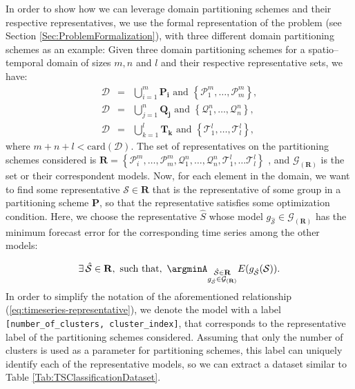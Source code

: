 In order to show how we can leverage domain partitioning schemes and their respective representatives, we use the formal representation of the problem (see Section \ref{Sec:ProblemFormalization}), with three different domain partitioning schemes as an example: Given three domain partitioning schemes for a spatio--temporal domain of sizes $m, n$ and $l$ and their respective representative sets, we have:
\begin{eqnarray} 
\nonumber
\mathcal{D}	& = & \bigcup_{i=1}^{m} \mathbf{P_i} \,\,\textrm{and} \,\, \left\{\mathcal{P}_{1}^{m}, \ldots, \mathcal{P}_{m}^{m}\right\},  \\ \nonumber
\mathcal{D} & = & \bigcup_{j=1}^{n} \mathbf{Q_j} \,\,\textrm{and} \,\, \left\{\mathcal{Q}_{1}^{n}, \ldots, \mathcal{Q}_{n}^{n}\right\}, \\ \nonumber 
\mathcal{D} & = & \bigcup_{k=1}^{l} \mathbf{T_k} \,\,\textrm{and} \,\, \left\{\mathcal{T}_{1}^{l}, \ldots, \mathcal{T}_{l}^{l}\right\},
\end{eqnarray}
where $m + n +l < \textrm{card}(\mathcal{D})$. The set of representatives on the partitioning schemes considered is $\mathbf{R} = \left\{\mathcal{P}_{i}^{m}, \ldots, \mathcal{P}_{m}^{m}, \mathcal{Q}_{1}^{n}, \ldots, \mathcal{Q}_{n}^{n}, \mathcal{T}_{1}^{l}, \ldots \mathcal{T}_{l}^{l} \right\}$ , and $\mathcal{G}_{(\mathbf{R})}$ is the set or their correspondent models. Now, for each element in the domain, we want to find some representative $\mathcal{S} \in \mathbf{R}$ that is the representative of some group in a partitioning scheme $\mathbf{P}$, so that the representative satisfies some optimization condition. Here, we choose the representative $\hat{S}$ whose model $g_{\mathcal{\hat{S}}} \in \mathcal{G}_{(\mathbf{R})}$ has the minimum forecast error for the corresponding time series among the other models:

\begin{equation}\label{eq:timeseries-representative}
\exists\, \mathcal{\hat{S}} \in \mathbf{R}, \,\, \textrm{such that}, \,\, \argminA_{\substack{\mathcal{\hat{S}} \in \mathbf{R}\\g_{\mathcal{\hat{S}}} \in \mathcal{G}_{(\mathbf{R})}}} E (g_{\mathcal{\hat{S}}}(\mathcal{S})).
\end{equation}
In order to simplify the notation of the aforementioned relationship (\ref{eq:timeseries-representative}), we denote the model with a label \texttt{[number\_of\_clusters, cluster\_index]}, that corresponds to the representative label of the partitioning schemes considered. Assuming that only the number of clusters is used as a parameter for partitioning schemes, this label can uniquely identify each of the representative models, so we can extract a dataset similar to Table \ref{Tab:TSClassificationDataset}.


